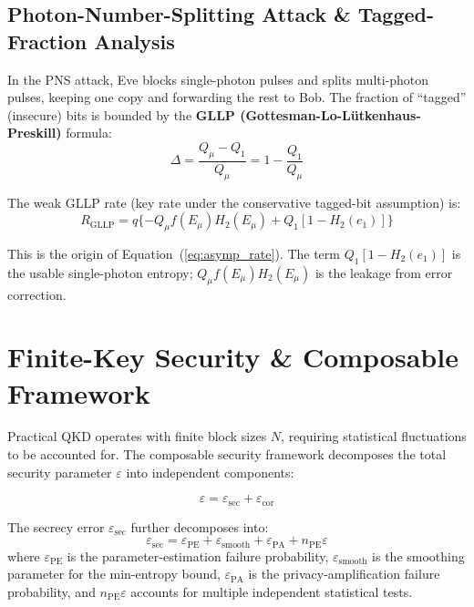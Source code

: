 \documentclass[11pt,a4paper,oneside]{report}
\begin{document}
\subsection{Photon-Number-Splitting Attack \& Tagged-Fraction Analysis}

In the PNS attack, Eve blocks single-photon pulses and splits multi-photon pulses, keeping one copy and forwarding the rest to Bob. The fraction of ``tagged'' (insecure) bits is bounded by the \textbf{GLLP (Gottesman-Lo-L\"{u}tkenhaus-Preskill)} formula:
\begin{equation}
\Delta = \frac{Q_\mu - Q_1}{Q_\mu} = 1 - \frac{Q_1}{Q_\mu}
\label{eq:tagged_fraction}
\end{equation}

The weak GLLP rate (key rate under the conservative tagged-bit assumption) is:
\begin{equation}
R_{\text{GLLP}} = q\{-Q_\mu f(E_\mu)H_2(E_\mu) + Q_1[1 - H_2(e_1)]\}
\end{equation}

This is the origin of Equation~(\ref{eq:asymp_rate}). The term $Q_1[1 - H_2(e_1)]$ is the usable single-photon entropy; $Q_\mu f(E_\mu) H_2(E_\mu)$ is the leakage from error correction.

\section{Finite-Key Security \& Composable Framework}

Practical QKD operates with finite block sizes $N$, requiring statistical fluctuations to be accounted for. The composable security framework decomposes the total security parameter $\varepsilon$ into independent components:

\begin{equation}
\varepsilon = \varepsilon_{\text{sec}} + \varepsilon_{\text{cor}}
\end{equation}

The secrecy error $\varepsilon_{\text{sec}}$ further decomposes into:
\begin{equation}
\varepsilon_{\text{sec}} = \varepsilon_{\text{PE}} + \varepsilon_{\text{smooth}} + \varepsilon_{\text{PA}} + n_{\text{PE}}\varepsilon
\end{equation}
where $\varepsilon_{\text{PE}}$ is the parameter-estimation failure probability, $\varepsilon_{\text{smooth}}$ is the smoothing parameter for the min-entropy bound, $\varepsilon_{\text{PA}}$ is the privacy-amplification failure probability, and $n_{\text{PE}}\varepsilon$ accounts for multiple independent statistical tests.
\end{document}
